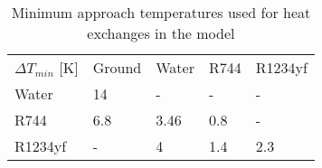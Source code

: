 \begin{table}[h!]
	\centering
	\caption{Minimum approach temperatures used for heat exchanges in the model}\vspace{2mm}
	\label{tab:dtmins} 
	\begin{tabular}{lllll}
	\toprule
		$\Delta T_{min}$ [K] & Ground & Water & R744 & R1234yf \\
		Water                & 14     & -     & -    & -       \\
		R744                 & 6.8    & 3.46  & 0.8  & -       \\
		R1234yf              & -      & 4     & 1.4  & 2.3    \\ \bottomrule
	\end{tabular}
\end{table}
